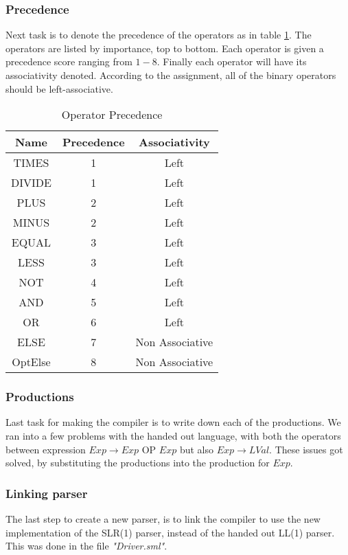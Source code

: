 \documentclass[10pt]{article}
\begin{document}
\subsubsection{Precedence}
Next task is to denote the precedence of the operators as in table \ref{tab:op_precedence}. The operators are listed by importance, top to bottom. Each operator is given a precedence score ranging from \(1-8\). Finally each operator will have its associativity denoted. According to the assignment, all of the binary operators should be left-associative.

\begin{table}
\begin{center}
\begin{tabular}{|c|c|c|}
\hline
Name & Precedence & Associativity\\
\hline
TIMES & 1 & Left\\
DIVIDE & 1 & Left\\
PLUS & 2 & Left\\
MINUS & 2 & Left\\
EQUAL & 3 & Left\\
LESS & 3 & Left\\
NOT & 4 & Left\\
AND & 5 & Left\\
OR & 6 & Left\\
ELSE & 7 & Non Associative\\
OptElse & 8 & Non Associative\\
\hline
\end{tabular}
\end{center}
\caption{\label{tab:op_precedence}Operator Precedence}
\end{table}

\subsubsection{Productions}
Last task for making the compiler is to write down each of the productions. We ran into a few problems with the handed out language, with both the operators between expression $Exp \rightarrow Exp \text{ OP } Exp$ but also $Exp \rightarrow LVal$. These issues got solved, by substituting the productions into the production for $Exp$.

\subsubsection{Linking parser}
The last step to create a new parser, is to link the compiler to use the new implementation of the SLR(1) parser, instead of the handed out LL(1) parser. This was done in the file \textit{"Driver.sml"}.
\end{document}
